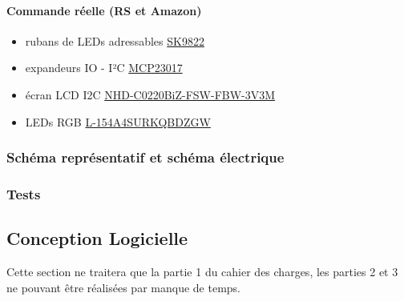 \documentclass[12pt]{report}
\begin{document}
	\paragraph{Commande réelle (RS et Amazon)}
	\begin{itemize}[label=$-$]
		\item rubans de LEDs adressables \href{https://fr.aliexpress.com/item/1005006918408592.html?spm=a2g0o.productlist.main.19.fbb0788296kxRo&algo_pvid=72d2c9a9-ec47-4e4b-9d14-7e90be35485c&algo_exp_id=72d2c9a9-ec47-4e4b-9d14-7e90be35485c-9&pdp_npi=4%40dis!EUR!18.92!18.92!!!145.68!145.68!%402103888a17169934968957029e0b2f!12000038723750387!sea!FR!0!AB&curPageLogUid=lAauznpLAY1Y&utparam-url=scene%3Asearch%7Cquery_from%3A}{SK9822}\\
		\item expandeurs IO - I²C \href{https://fr.farnell.com/microchip/mcp23017-e-sp/16-bit-expander-i-o-i2c-i-f/dp/1332088}{MCP23017}\\
		\item écran LCD I2C \href{https://fr.rs-online.com/web/p/afficheurs-monochromes-lcd/2644045?searchId=b08a66da-698d-420f-a525-b4944d7ccd96&gb=s}{NHD-C0220BiZ-FSW-FBW-3V3M}\\
		\item LEDs RGB \href{https://fr.rs-online.com/web/p/leds/1651767?gb=s}{L-154A4SURKQBDZGW}\\
	\end{itemize}
	\subsubsection{Schéma représentatif et schéma électrique}
	\subsubsection{Tests}
	\subsection{Conception Logicielle}
	Cette section ne traitera que la partie 1 du cahier des charges, les parties 2 et 3 ne pouvant être réalisées par manque de temps.\\
\end{document}
